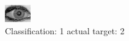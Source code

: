 \begin{figure}[h!]
\begin{center}
\includegraphics[width=0.60\columnwidth]{figures/ID2007_class_1_target_2.png}
\end{center}
\caption{ Classification: 1 actual target: 2}
\label{fig:ID2007_class_1_target_2}
\end{figure}
